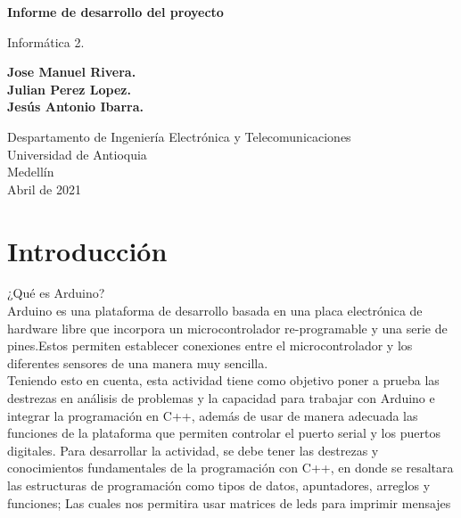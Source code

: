 \documentclass{article}
\begin{document}
\begin{titlepage}
    \begin{center}
        \vspace*{1cm}
            
        \Huge
        \textbf{Informe de desarrollo del proyecto}
            
        \vspace{0.5cm}
        \LARGE
        Informática 2.
            
        \vspace{1.5cm}
            
        \textbf{Jose Manuel Rivera.\\
        Julian Perez Lopez.\\
        Jesús Antonio Ibarra.}
            
        \vfill
            
        \vspace{0.8cm}
            
        \Large
        Despartamento de Ingeniería Electrónica y Telecomunicaciones\\
        Universidad de Antioquia\\
        Medellín\\
        Abril de 2021
            
    \end{center}
\end{titlepage}

\tableofcontents
\newpage
\section{Introducción}\label{intro}
¿Qué es Arduino?\\

Arduino es una plataforma de desarrollo basada en una placa electrónica de hardware libre que incorpora un microcontrolador re-programable y una serie de pines.Estos permiten establecer conexiones entre el microcontrolador y los diferentes sensores de una manera muy sencilla.\\

Teniendo esto en cuenta, esta actividad tiene como objetivo poner a prueba las destrezas en análisis de problemas y la capacidad para trabajar con Arduino e integrar la programación en C++, además de usar de manera adecuada las funciones de la plataforma que permiten controlar el puerto serial y los puertos digitales. Para desarrollar la actividad, se debe tener las destrezas y conocimientos fundamentales de la programación con C++, en donde se  resaltara las estructuras de programación como tipos de datos, apuntadores, arreglos y funciones; Las cuales nos permitira usar matrices de leds para imprimir mensajes
\end{document}
